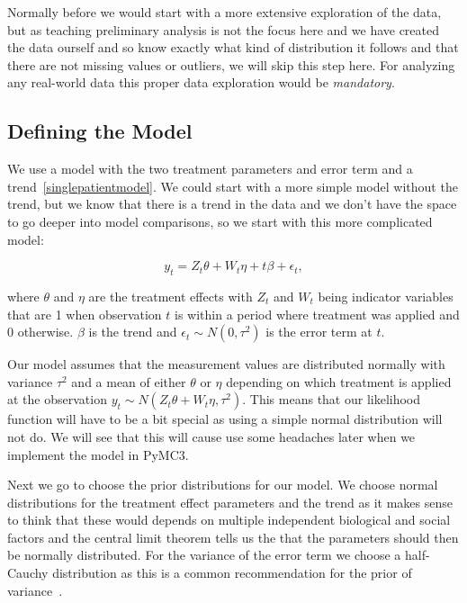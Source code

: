 \documentclass[12pt,a4paper,leqno]{report}
\theoremstyle{plain}
\theoremstyle{definition}
\theoremstyle{remark}
\begin{document}
Normally before we would start with a more extensive exploration of the data, but as teaching preliminary analysis
is not the focus here and we have created the data ourself and so know exactly what kind
of distribution it follows and that there are not missing values or outliers, we will
skip this step here. For analyzing any real-world data this proper data exploration would be \emph{mandatory}.

\subsection{Defining the Model}

We use a model with the two treatment parameters and error term and a trend\ \ref{singlepatientmodel}. We could
start with a more simple model without the trend, but we know that there is a trend in
the data and we don't have the space to go deeper into model comparisons, so we start
with this more complicated model:

\begin{def}\label{}
    \begin{equation}\label{singlepatientmodel}
        y_t = Z_t\theta + W_t\eta + t\beta + \epsilon_t,
    \end{equation}
\end{def}where \(\theta \) and \(\eta \) are the treatment effects with \(Z_t\) and \(W_t\) being indicator
variables that are 1 when observation \(t\) is within a period where treatment was applied and
0 otherwise. \(\beta \) is the trend and \(\epsilon_{t} \sim N(0,\tau^2) \) is the error term at \(t\).

Our model assumes that the measurement values are distributed normally with
variance \(\tau^2\) and a mean of either \(\theta \) or \(\eta \) depending on which
treatment is applied at the observation \(y_t \sim N(Z_t\theta + W_t\eta, \tau^2)\).
This means that our likelihood function will have to be a bit special as using a simple
normal distribution will not do. We will see that this will cause use some headaches
later when we implement the model in PyMC3.

Next we go to choose the prior distributions for our model. We choose
normal distributions for the treatment effect parameters and the trend as it makes sense to think
that these would depends on multiple independent biological and social
factors and the central limit theorem tells us the that
the parameters should then be normally distributed. For the variance of the error
term we choose a half-Cauchy distribution as this is a common recommendation for the
prior of variance\ \cite{variancepriors}.
\end{document}
